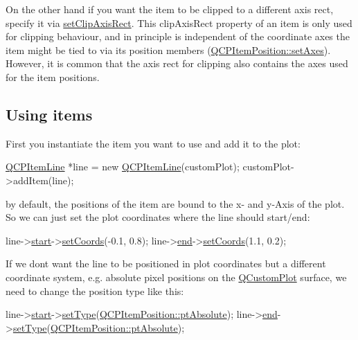 On the other hand if you want the item to be clipped to a different axis rect, specify it via \hyperlink{class_q_c_p_abstract_item_a7dc75fcbcd10206fe0b75d757ea7a347}{set\+Clip\+Axis\+Rect}. This clip\+Axis\+Rect property of an item is only used for clipping behaviour, and in principle is independent of the coordinate axes the item might be tied to via its position members (\hyperlink{class_q_c_p_item_position_a2185f45c75ac8cb9be89daeaaad50e37}{Q\+C\+P\+Item\+Position\+::set\+Axes}). However, it is common that the axis rect for clipping also contains the axes used for the item positions.\hypertarget{class_q_c_p_abstract_item_items-using}{}\subsection{Using items}\label{class_q_c_p_abstract_item_items-using}
First you instantiate the item you want to use and add it to the plot\+: 
\begin{DoxyCode}
\hyperlink{class_q_c_p_item_line}{QCPItemLine} *line = \textcolor{keyword}{new} \hyperlink{class_q_c_p_item_line}{QCPItemLine}(customPlot);
customPlot->addItem(line);
\end{DoxyCode}
 by default, the positions of the item are bound to the x-\/ and y-\/\+Axis of the plot. So we can just set the plot coordinates where the line should start/end\+: 
\begin{DoxyCode}
line->\hyperlink{class_q_c_p_item_line_a602da607a09498b0f152ada1d6851bc5}{start}->\hyperlink{class_q_c_p_item_position_aa988ba4e87ab684c9021017dcaba945f}{setCoords}(-0.1, 0.8);
line->\hyperlink{class_q_c_p_item_line_a15598864c1c22a2497a1979c4980c4e1}{end}->\hyperlink{class_q_c_p_item_position_aa988ba4e87ab684c9021017dcaba945f}{setCoords}(1.1, 0.2);
\end{DoxyCode}
 If we don\textquotesingle{}t want the line to be positioned in plot coordinates but a different coordinate system, e.\+g. absolute pixel positions on the \hyperlink{class_q_custom_plot}{Q\+Custom\+Plot} surface, we need to change the position type like this\+: 
\begin{DoxyCode}
line->\hyperlink{class_q_c_p_item_line_a602da607a09498b0f152ada1d6851bc5}{start}->\hyperlink{class_q_c_p_item_position_aa476abf71ed8fa4c537457ebb1a754ad}{setType}(\hyperlink{class_q_c_p_item_position_aad9936c22bf43e3d358552f6e86dbdc8a564f5e53e550ead1ec5fc7fc7d0b73e0}{QCPItemPosition::ptAbsolute});
line->\hyperlink{class_q_c_p_item_line_a15598864c1c22a2497a1979c4980c4e1}{end}->\hyperlink{class_q_c_p_item_position_aa476abf71ed8fa4c537457ebb1a754ad}{setType}(\hyperlink{class_q_c_p_item_position_aad9936c22bf43e3d358552f6e86dbdc8a564f5e53e550ead1ec5fc7fc7d0b73e0}{QCPItemPosition::ptAbsolute});
\end{DoxyCode}
